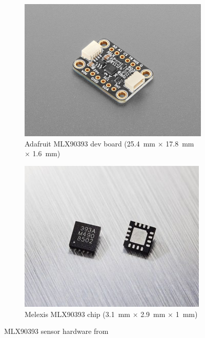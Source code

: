 \begin{figure}[ht]
    \centering
    \begin{subfigure}[b]{0.45\textwidth}
        \centering
        \includegraphics[width=\linewidth]{figures/mlx90393}
        \caption{Adafruit MLX90393 dev board (\SI{25.4}{\milli\meter} $\times$ \SI{17.8}{\milli\meter} $\times$ \SI{1.6}{\milli\meter})}
    \end{subfigure}
    \hfill
    \begin{subfigure}[b]{0.45\textwidth}
        \centering
        \includegraphics[width=\linewidth]{figures/mlx90393-chip}
        \caption{Melexis MLX90393 chip (\SI{3.1}{\milli\meter} $\times$ \SI{2.9}{\milli\meter} $\times$ \SI{1}{\milli\meter})}
    \end{subfigure}
    \caption{MLX90393 sensor hardware from \cite{MLX90393}}
    \label{fig:sensor}
\end{figure}

